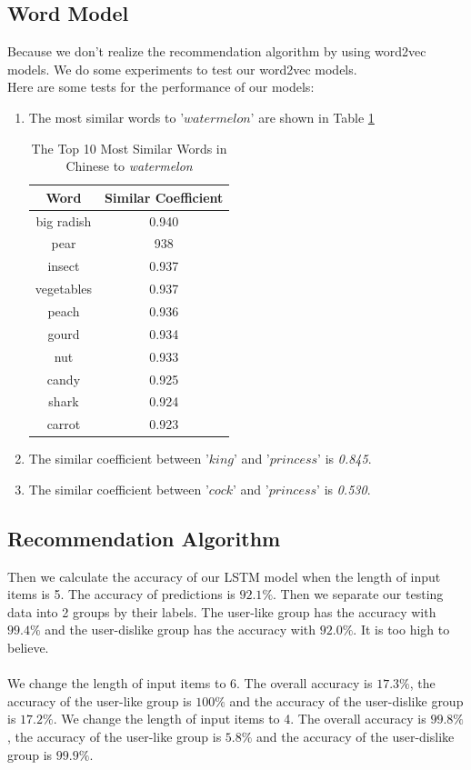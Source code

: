 \documentclass[sigconf]{acmart}
\begin{document}
\subsection{Word Model}
Because we don't realize the recommendation algorithm by using word2vec models. We do some experiments to test our word2vec models.
\\
Here are some tests for the performance of our models:
\begin{enumerate}
\item The most similar words to '$watermelon$' are shown in Table \ref{tab:word2vec_test}

\begin{table}
  \caption{The Top 10 Most Similar Words in Chinese to \emph{
watermelon}}
  \label{tab:word2vec_test}
  \begin{tabular}{cc}
    \toprule
    Word & Similar Coefficient\\
    \midrule
    big radish & 0.940 \\
    pear & 938 \\
    insect & 0.937 \\
    vegetables & 0.937 \\
    peach & 0.936 \\
    gourd & 0.934 \\
    nut & 0.933 \\
    candy & 0.925 \\
    shark & 0.924 \\
    carrot & 0.923 \\
  \bottomrule
\end{tabular}
\end{table}

\item The similar coefficient between '$king$' and '$princess$' is \emph{0.845}.
\item The similar coefficient between '$cock$' and '$princess$' is \emph{0.530}.
\end{enumerate}
\subsection{Recommendation Algorithm}
Then we calculate the accuracy of our LSTM model when the length of input items is 5. The accuracy of predictions is $92.1\%$. Then we separate our testing data into 2 groups by their labels. The user-like group has the accuracy with $99.4\%$ and the user-dislike group has the accuracy with $92.0\%$. It is too high to believe. 
\\\\
We change the length of input items to 6. The overall accuracy is $17.3\%$, the accuracy of the user-like group is $100\%$ and the accuracy of the user-dislike group is $17.2\%$.  We change the length of input items to 4. The overall accuracy is $99.8\%$, the accuracy of the user-like group is $5.8\%$ and the accuracy of the user-dislike group is $99.9\%$. 
\end{document}
